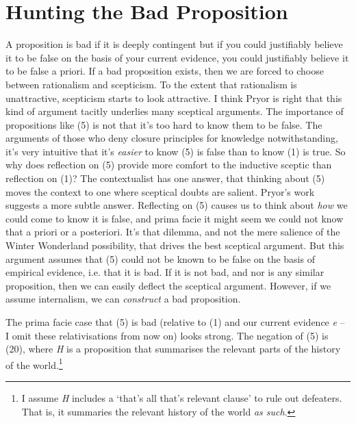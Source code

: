 \section{Hunting the Bad Proposition}

A proposition is bad if it is deeply contingent but if you could justifiably believe it to be false on the basis of your current evidence, you could justifiably believe it to be false a priori. If a bad proposition exists, then we are forced to choose between rationalism and scepticism. To the extent that rationalism is unattractive, scepticism starts to look attractive. I think Pryor is right that this kind of argument tacitly underlies many sceptical arguments. The importance of propositions like (5) is not that it's too hard to know them to be false. The arguments of those who deny closure principles for knowledge notwithstanding, it's very intuitive that it's \textit{easier} to know (5) is false than to know (1) is true. So why does reflection on (5) provide more comfort to the inductive sceptic than reflection on (1)? The contextualist has one answer, that thinking about (5) moves the context to one where sceptical doubts are salient. Pryor's work suggests a more subtle answer. Reflecting on (5) causes us to think about \textit{how} we could come to know it is false, and prima facie it might seem we could not know that a priori or a posteriori. It's that dilemma, and not the mere salience of the Winter Wonderland possibility, that drives the best sceptical argument. But this argument assumes that (5) could not be known to be false on the basis of empirical evidence, i.e. that it is bad. If it is not bad, and nor is any similar proposition, then we can easily deflect the sceptical argument. However, if we assume internalism, we can \textit{construct }a bad proposition. 

The prima facie case that (5) is bad (relative to (1) and our current evidence \textit{e} -- I omit these relativisations from now on) looks strong. The negation of (5) is (20), where \textit{H} is a proposition that summarises the relevant parts of the history of the world.\footnote{I assume \textit{H} includes a `that's all that's relevant clause' to rule out defeaters. That is, it summaries the relevant history of the world \textit{as such}.}


